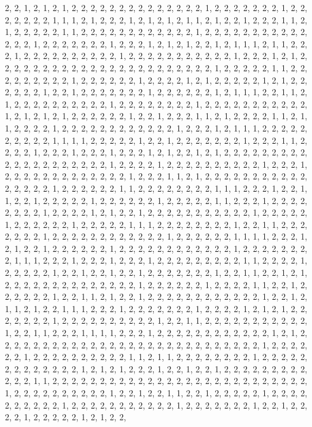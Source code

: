 \documentclass[
]{article}
\begin{document}
\begin{Schunk}
\begin{Soutput}
2, 2, 1, 2, 1, 2, 1, 2, 2, 2, 2, 2, 2, 2, 2, 2, 2, 2, 2, 2, 2, 1, 2, 2, 2, 2, 2, 2, 2, 1, 2, 2, 2, 2, 2, 2, 2, 1, 1, 1, 2, 1, 2, 2, 2, 1, 2, 1, 2, 1, 2, 1, 1, 2, 1, 2, 2, 1, 2, 2, 2, 1, 1, 2, 1, 2, 2, 2, 2, 2, 1, 1, 2, 2, 2, 2, 2, 2, 2, 2, 2, 2, 2, 2, 1, 2, 2, 2, 2, 2, 2, 2, 2, 2, 2, 2, 2, 2, 2, 1, 2, 2, 2, 2, 2, 2, 2, 1, 2, 2, 2, 1, 2, 1, 2, 1, 2, 2, 1, 2, 1, 1, 1, 2, 1, 1, 2, 2, 2, 1, 2, 2, 2, 2, 2, 2, 2, 2, 2, 2, 1, 2, 2, 2, 2, 2, 2, 2, 2, 2, 2, 2, 1, 2, 2, 2, 1, 2, 1, 2, 2, 2, 2, 2, 2, 2, 2, 2, 2, 2, 2, 2, 2, 2, 2, 2, 2, 2, 2, 2, 2, 2, 1, 2, 2, 2, 2, 2, 1, 1, 2, 2, 2, 2, 2, 2, 2, 2, 2, 1, 2, 2, 2, 2, 2, 2, 1, 2, 2, 2, 2, 1, 2, 1, 2, 2, 2, 2, 2, 1, 2, 1, 2, 2, 2, 2, 2, 2, 1, 2, 2, 1, 2, 2, 2, 2, 2, 2, 2, 1, 2, 2, 2, 2, 2, 2, 1, 2, 1, 1, 1, 2, 2, 1, 1, 2, 1, 2, 2, 2, 2, 2, 2, 2, 2, 2, 2, 1, 2, 2, 2, 2, 2, 2, 2, 2, 1, 2, 2, 2, 2, 2, 2, 2, 2, 2, 2, 2, 1, 2, 1, 2, 1, 2, 1, 2, 2, 2, 2, 2, 2, 1, 2, 2, 1, 2, 2, 2, 1, 1, 2, 1, 2, 2, 2, 2, 1, 1, 2, 1, 1, 2, 2, 2, 2, 1, 2, 2, 2, 2, 2, 2, 2, 2, 2, 2, 2, 2, 1, 2, 2, 2, 1, 2, 1, 1, 1, 2, 2, 2, 2, 2, 2, 2, 2, 2, 2, 1, 1, 1, 1, 2, 2, 2, 2, 2, 1, 2, 2, 1, 2, 2, 2, 2, 2, 2, 2, 1, 2, 2, 2, 1, 1, 2, 2, 2, 2, 1, 2, 2, 2, 1, 2, 2, 2, 1, 2, 2, 2, 1, 2, 1, 2, 2, 1, 2, 1, 2, 2, 2, 2, 2, 2, 2, 2, 2, 2, 2, 2, 2, 2, 2, 2, 2, 2, 2, 2, 1, 2, 2, 2, 2, 1, 2, 2, 2, 2, 2, 2, 2, 2, 2, 2, 1, 2, 2, 2, 1, 2, 2, 2, 2, 2, 2, 2, 2, 2, 2, 2, 2, 2, 1, 2, 2, 2, 1, 1, 2, 1, 2, 2, 2, 2, 2, 2, 2, 2, 2, 2, 2, 2, 2, 2, 2, 2, 1, 2, 2, 2, 2, 2, 2, 1, 1, 2, 2, 2, 2, 2, 2, 2, 2, 1, 1, 1, 2, 2, 2, 1, 2, 2, 1, 1, 2, 2, 1, 2, 2, 2, 2, 2, 1, 2, 2, 2, 2, 2, 2, 1, 2, 2, 2, 2, 2, 1, 1, 2, 2, 2, 1, 2, 2, 2, 2, 2, 2, 2, 2, 1, 2, 2, 2, 2, 1, 2, 1, 2, 2, 1, 2, 2, 2, 2, 2, 2, 2, 2, 2, 2, 2, 1, 2, 2, 2, 2, 2, 1, 2, 2, 2, 2, 2, 2, 1, 2, 2, 2, 2, 2, 1, 1, 1, 2, 2, 2, 2, 2, 2, 2, 2, 1, 2, 2, 1, 1, 2, 2, 2, 2, 2, 2, 2, 1, 2, 2, 2, 2, 2, 2, 2, 2, 2, 2, 2, 2, 1, 2, 2, 2, 2, 2, 2, 1, 1, 1, 1, 2, 2, 2, 1, 2, 1, 2, 2, 1, 2, 2, 2, 2, 2, 2, 1, 2, 2, 2, 2, 2, 2, 2, 2, 2, 2, 2, 2, 1, 2, 2, 2, 2, 2, 2, 2, 2, 1, 1, 1, 2, 2, 2, 1, 2, 2, 2, 1, 2, 2, 2, 1, 2, 2, 2, 2, 2, 2, 2, 2, 2, 1, 1, 2, 2, 2, 2, 1, 2, 2, 2, 2, 2, 1, 2, 2, 1, 2, 2, 1, 2, 2, 1, 2, 2, 2, 2, 2, 2, 2, 1, 2, 2, 1, 1, 2, 2, 1, 2, 1, 2, 2, 2, 2, 2, 2, 2, 2, 2, 2, 2, 2, 2, 2, 1, 2, 2, 2, 2, 2, 2, 1, 2, 2, 2, 2, 1, 1, 2, 2, 1, 2, 2, 2, 2, 2, 2, 1, 2, 2, 1, 1, 2, 1, 2, 2, 1, 2, 2, 2, 2, 2, 2, 2, 2, 2, 2, 2, 2, 1, 2, 2, 1, 2, 1, 1, 2, 1, 2, 2, 1, 1, 1, 2, 2, 2, 1, 2, 2, 2, 2, 2, 2, 2, 1, 2, 2, 2, 2, 1, 2, 1, 2, 1, 2, 2, 2, 2, 2, 2, 2, 1, 2, 2, 2, 2, 2, 2, 2, 2, 2, 2, 1, 2, 2, 1, 1, 2, 2, 2, 2, 2, 2, 2, 2, 2, 2, 2, 1, 2, 2, 1, 1, 2, 2, 2, 1, 1, 1, 1, 2, 2, 2, 1, 2, 2, 2, 2, 2, 2, 2, 2, 2, 2, 2, 2, 1, 2, 1, 2, 2, 2, 2, 2, 2, 2, 2, 2, 2, 2, 2, 2, 2, 2, 2, 2, 2, 2, 2, 2, 2, 2, 2, 2, 2, 2, 2, 1, 2, 2, 2, 2, 2, 2, 1, 2, 2, 2, 2, 2, 2, 2, 2, 2, 2, 1, 1, 2, 1, 1, 2, 2, 2, 2, 2, 2, 2, 2, 1, 2, 2, 2, 2, 2, 2, 2, 2, 2, 2, 2, 2, 2, 1, 2, 1, 2, 1, 2, 2, 2, 1, 2, 2, 1, 2, 2, 1, 2, 2, 2, 2, 2, 2, 2, 2, 2, 2, 2, 2, 1, 1, 2, 2, 2, 2, 2, 2, 2, 2, 2, 2, 2, 2, 2, 2, 2, 2, 2, 2, 2, 2, 2, 2, 2, 2, 2, 2, 2, 1, 2, 2, 2, 2, 2, 2, 2, 2, 2, 2, 1, 2, 2, 1, 2, 2, 1, 1, 2, 2, 1, 2, 2, 2, 2, 2, 1, 2, 2, 2, 2, 2, 2, 2, 2, 2, 2, 1, 2, 2, 2, 2, 2, 2, 2, 2, 2, 2, 2, 1, 2, 2, 2, 2, 2, 2, 2, 1, 2, 2, 1, 2, 2, 2, 2, 1, 2, 2, 2, 2, 2, 1, 2, 1, 2, 2, 
\end{Soutput}
\end{Schunk}
\end{document}
